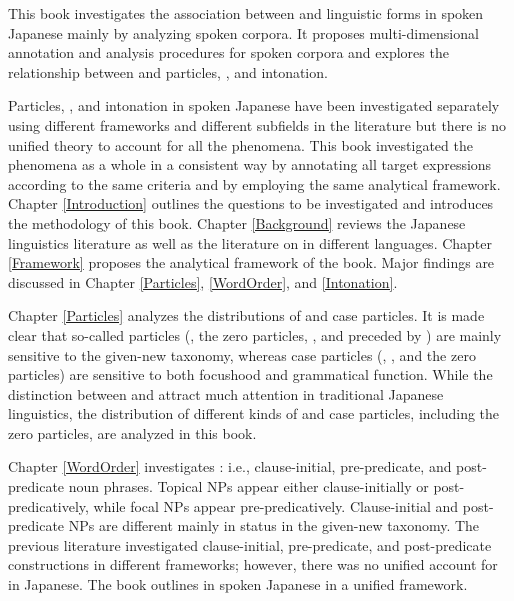 \label{Abstract}
\begin{refsection}

This book investigates the association between 
and linguistic forms in spoken Japanese
mainly by analyzing spoken corpora.
It proposes multi-dimensional annotation and analysis procedures for spoken corpora and
explores the relationship between 
and particles, , and intonation.

Particles, , and intonation in spoken Japanese have been investigated separately using different frameworks and different subfields in the literature
but there is no unified theory to account for all the phenomena.
This book investigated the phenomena as a whole in a consistent way
by annotating all target expressions according to the same criteria and
by employing the same analytical framework.
Chapter \ref{Introduction} outlines the questions to be investigated and introduces the methodology of this book.
Chapter \ref{Background} reviews the Japanese linguistics literature
as well as the literature on  in different languages.
Chapter \ref{Framework} proposes the analytical framework of the book.
Major findings are discussed in Chapter \ref{Particles}, \ref{WordOrder}, and \ref{Intonation}.

Chapter \ref{Particles} analyzes the distributions of  and case particles.
It is made clear that so-called  particles 
(, the zero particles, , and  preceded by ) are mainly sensitive to the given-new taxonomy,
whereas case particles (, , and the zero particles) are sensitive to both focushood and grammatical function.
While the distinction between  and  attract much attention in traditional Japanese linguistics,
the distribution of different kinds of  and case particles, including the zero particles,
are analyzed in this book.

Chapter \ref{WordOrder} investigates :
i.e., clause-initial, pre-predicate, and post-pred\-i\-cate noun phrases. %
Topical NPs appear either clause-initially or post-pred\-i\-cat\-ively,
while focal NPs appear pre-predicatively.
Clause-initial and post-pred\-i\-cate NPs are different mainly in status in the given-new taxonomy.
The previous literature investigated clause-initial, pre-predicate, and post-predicate constructions in different frameworks;
however, there was no unified account for  in Japanese.
The book outlines  in spoken Japanese in a unified framework.


\end{refsection}
